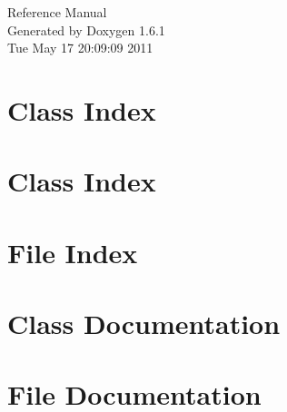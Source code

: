 \documentclass[a4paper]{book}
\begin{document}
\hypersetup{pageanchor=false}
\begin{titlepage}
\vspace*{7cm}
\begin{center}
{\Large Reference Manual}\\
\vspace*{1cm}
{\large Generated by Doxygen 1.6.1}\\
\vspace*{0.5cm}
{\small Tue May 17 20:09:09 2011}\\
\end{center}
\end{titlepage}
\clearemptydoublepage
{}
\tableofcontents
\clearemptydoublepage
{}
\hypersetup{pageanchor=true}
\chapter{Class Index}

\chapter{Class Index}

\chapter{File Index}

\chapter{Class Documentation}




























\chapter{File Documentation}













\printindex
\end{document}
